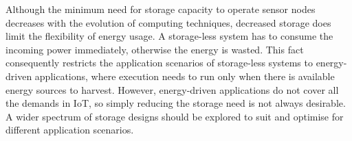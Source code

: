 Although the minimum need for storage capacity to operate sensor nodes decreases with the evolution of computing techniques, decreased storage does limit the flexibility of energy usage. A storage-less system has to consume the incoming power immediately, otherwise the energy is wasted. This fact consequently restricts the application scenarios of storage-less systems to energy-driven applications, where execution needs to run only when there is available energy sources to harvest. However, energy-driven applications do not cover all the demands in IoT, so simply reducing the storage need is not always desirable. A wider spectrum of storage designs should be explored to suit and optimise for different application scenarios.

